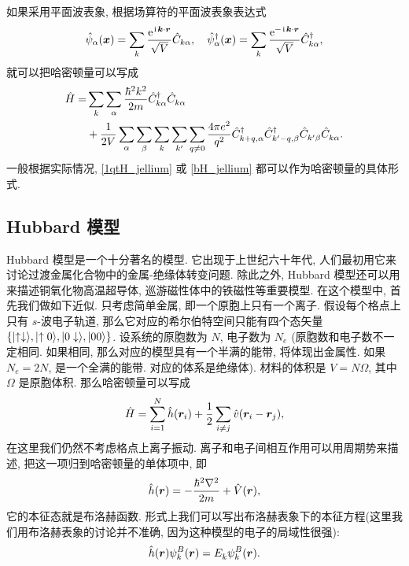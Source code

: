 如果采用平面波表象, 根据场算符的平面波表象表达式
\begin{equation}
   \hat\psi_\alpha(\boldsymbol{x})=\sum_{ k}\frac{\mathrm{e}^{\hspace{0.1em}\mathrm{i}\hspace{0.1em}\boldsymbol{k}\cdot\boldsymbol{r}}}{\sqrt{V}}\hat C_{ k\alpha}, \quad \hat\psi_{\alpha}^\dagger(\boldsymbol{x})=\sum_{k}\frac{\mathrm{e}^{-\hspace{0.1em}\mathrm{i}\hspace{0.1em}\boldsymbol{k}\cdot \boldsymbol{r}}}{\sqrt{V}}\hat C_{ k\alpha}^\dagger, 
\end{equation}
就可以把哈密顿量可以写成
\begin{align}\label{bH_jellium}
      \hat H=&\sum_{k}\sum_\alpha\frac{\hbar^2 k^2}{2m}\hat C_{k\alpha}^\dagger \hat C_{k\alpha}^{} \nonumber    \\ 
&+\frac{1}{2V}\sum_\alpha\sum_\beta\sum_{k}\sum_{k'}\sum_{q\ne 0}\frac{4\pi e^2}{q^2}\hat C_{{k+q}, \alpha}^\dagger \hat C_{{k'-q}, \beta}^\dagger \hat C^{}_{k'\beta}\hat C^{}_{ k \alpha}. 
   \end{align}
一般根据实际情况, \eqref{1qtH_jellium} 或 \eqref{bH_jellium} 都可以作为哈密顿量的具体形式. 

\subsection{Hubbard 模型}
Hubbard 模型是一个十分著名的模型. 它出现于上世纪六十年代, 人们最初用它来讨论过渡金属化合物中的金属-绝缘体转变问题. 除此之外, Hubbard 模型还可以用来描述铜氧化物高温超导体, 巡游磁性体中的铁磁性等重要模型. 
在这个模型中, 首先我们做如下近似. 只考虑简单金属, 即一个原胞上只有一个离子. 假设每个格点上只有 $s$-波电子轨道, 那么它对应的希尔伯特空间只能有四个态矢量 $\{\mid\uparrow\downarrow\rangle, \mid\uparrow 0\rangle, |0\downarrow\rangle, |00\rangle \}$. 设系统的原胞数为 $N$, 电子数为 $N_e$ (原胞数和电子数不一定相同. 如果相同, 那么对应的模型具有一个半满的能带, 将体现出金属性. 如果 $N_e=2N$, 是一个全满的能带. 对应的体系是绝缘体). 材料的体积是 $V=N\Omega$, 其中 $\Omega$ 是原胞体积. 那么哈密顿量可以写成
\begin{equation}
   \hat H=\sum_{i=1}^N \hat h(\boldsymbol{r}_i)+\frac{1}{2}\sum_{i\ne j}\hat v(\boldsymbol{r}_i-\boldsymbol{r}_j), 
\end{equation}
在这里我们仍然不考虑格点上离子振动. 离子和电子间相互作用可以用周期势来描述, 把这一项归到哈密顿量的单体项中, 即
\begin{equation}
   \hat h(\boldsymbol{r})=-\frac{\hbar^2\nabla^2}{2m}+\hat V(\boldsymbol{r}), 
\end{equation}
它的本征态就是布洛赫函数. 形式上我们可以写出布洛赫表象下的本征方程(这里我们用布洛赫表象的讨论并不准确, 因为这种模型的电子的局域性很强): 
\begin{equation}
   \hat h(\boldsymbol{r})\psi_{k}^B(\boldsymbol{r})=E^{}_k\psi_{ k}^B(\boldsymbol{r}).
\end{equation}

